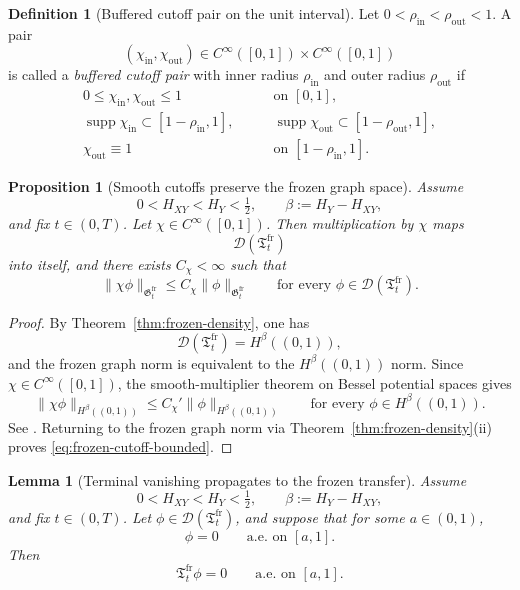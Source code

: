 \documentclass[11pt,a4paper]{amsart}
\theoremstyle{plain}
\newtheorem{proposition}[theorem]{Proposition}
\newtheorem{lemma}[theorem]{Lemma}
\theoremstyle{definition}
\newtheorem{definition}[theorem]{Definition}
\theoremstyle{remark}
\begin{document}
\begin{definition}[Buffered cutoff pair on the unit interval]\label{def:buffer-pair}
Let \(0<\rho_{\mathrm{in}}<\rho_{\mathrm{out}}<1\). A pair
\[
(\chi_{\mathrm{in}},\chi_{\mathrm{out}})\in C^\infty([0,1])\times C^\infty([0,1])
\]
is called a \emph{buffered cutoff pair} with inner radius \(\rho_{\mathrm{in}}\) and outer radius
\(\rho_{\mathrm{out}}\) if
\begin{align}
0\le \chi_{\mathrm{in}},\chi_{\mathrm{out}} \le 1
\qquad&\text{on }[0,1], \label{eq:buffer-cutoff-bounds}\\
\operatorname{supp}\chi_{\mathrm{in}} \subset [1-\rho_{\mathrm{in}},1],
\qquad&
\operatorname{supp}\chi_{\mathrm{out}} \subset [1-\rho_{\mathrm{out}},1], \label{eq:buffer-cutoff-support}\\
\chi_{\mathrm{out}}\equiv 1
\qquad&\text{on }[1-\rho_{\mathrm{in}},1]. \label{eq:buffer-cutoff-one}
\end{align}
\end{definition}

\begin{proposition}[Smooth cutoffs preserve the frozen graph space]
\label{prop:frozen-cutoff-bounded}
Assume
\[
0<H_{XY}<H_Y<\tfrac12,
\qquad
\beta:=H_Y-H_{XY},
\]
and fix \(t\in(0,T)\). Let \(\chi\in C^\infty([0,1])\). Then multiplication by \(\chi\) maps
\[
\mathcal D(\mathfrak T_t^{\mathrm{fr}})
\]
into itself, and there exists \(C_\chi<\infty\) such that
\begin{equation}\label{eq:frozen-cutoff-bounded}
\|\chi\phi\|_{\mathfrak G_t^{\mathrm{fr}}}
\le
C_\chi\|\phi\|_{\mathfrak G_t^{\mathrm{fr}}}
\qquad\text{for every }\phi\in\mathcal D(\mathfrak T_t^{\mathrm{fr}}).
\end{equation}
\end{proposition}

\begin{proof}
By Theorem~\ref{thm:frozen-density}, one has
\[
\mathcal D(\mathfrak T_t^{\mathrm{fr}})=H^\beta((0,1)),
\]
and the frozen graph norm is equivalent to the \(H^\beta((0,1))\) norm. Since \(\chi\in
C^\infty([0,1])\), the smooth-multiplier theorem on Bessel potential spaces gives
\[
\|\chi\phi\|_{H^\beta((0,1))}
\le
C_\chi'\|\phi\|_{H^\beta((0,1))}
\qquad\text{for every }\phi\in H^\beta((0,1)).
\]
See \cite[Ch.~2]{Triebel83}. 
Returning to the frozen graph norm via Theorem~\ref{thm:frozen-density}(ii) proves
\eqref{eq:frozen-cutoff-bounded}.
\end{proof}

\begin{lemma}[Terminal vanishing propagates to the frozen transfer]
\label{lem:frozen-terminal-zero}
Assume
\[
0<H_{XY}<H_Y<\tfrac12,
\qquad
\beta:=H_Y-H_{XY},
\]
and fix \(t\in(0,T)\). Let \(\phi\in\mathcal D(\mathfrak T_t^{\mathrm{fr}})\), and suppose that for
some \(a\in(0,1)\),
\[
\phi=0
\qquad\text{a.e. on }[a,1].
\]
Then
\begin{equation}\label{eq:frozen-terminal-zero}
\mathfrak T_t^{\mathrm{fr}}\phi=0
\qquad\text{a.e. on }[a,1].
\end{equation}
\end{lemma}
\end{document}
